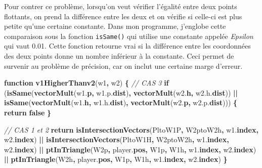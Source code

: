 \documentclass[11pt,french,a4paper,]{article}
\newenvironment{Shaded}{\begin{snugshade}}{\end{snugshade}}
\newcommand{\AttributeTok}[1]{\textcolor[rgb]{0.00,0.36,0.77}{\textbf{#1}}}
\newcommand{\CommentTok}[1]{\textcolor[rgb]{0.35,0.35,0.35}{\textit{#1}}}
\newcommand{\ControlFlowTok}[1]{\textcolor[rgb]{0.68,0.35,0.62}{\textbf{#1}}}
\newcommand{\KeywordTok}[1]{\textcolor[rgb]{0.68,0.35,0.62}{\textbf{#1}}}
\newcommand{\NormalTok}[1]{#1}
\newcommand{\OperatorTok}[1]{\textcolor[rgb]{0.81,0.36,0.00}{\textbf{#1}}}
\newcommand{\VariableTok}[1]{\textcolor[rgb]{0.90,0.33,0.00}{#1}}
\begin{document}
Pour contrer ce problème, lorsqu'on veut vérifier l'égalité entre deux
points flottants, on prend la différence entre les deux et on vérifie si
celle-ci est plus petite qu'une certaine constante. Dans mon programme,
j'englobe cette comparaison sous la fonction \texttt{isSame()} qui
utilise une constante appelée \emph{Epsilon} qui vaut 0.01. Cette
fonction retourne vrai si la différence entre les coordonnées des deux
points donne un nombre inférieur à la constante. Ceci permet de survenir
au problème de précision, car on inclut une certaine marge d'erreur.

\begin{Shaded}
\begin{Highlighting}[]
\KeywordTok{function} \AttributeTok{v1HigherThanv2}\NormalTok{(w1}\OperatorTok{,}\NormalTok{ w2) }\OperatorTok{\{}
    \CommentTok{// CAS 3}
    \ControlFlowTok{if}\NormalTok{ (}\AttributeTok{isSame}\NormalTok{(}\AttributeTok{vectorMult}\NormalTok{(}\VariableTok{w1}\NormalTok{.}\AttributeTok{p}\OperatorTok{,} \VariableTok{w1}\NormalTok{.}\VariableTok{p}\NormalTok{.}\AttributeTok{dist}\NormalTok{)}\OperatorTok{,} \AttributeTok{vectorMult}\NormalTok{(}\VariableTok{w2}\NormalTok{.}\AttributeTok{h}\OperatorTok{,} \VariableTok{w2}\NormalTok{.}\VariableTok{h}\NormalTok{.}\AttributeTok{dist}\NormalTok{)) }\OperatorTok{||}
        \AttributeTok{isSame}\NormalTok{(}\AttributeTok{vectorMult}\NormalTok{(}\VariableTok{w1}\NormalTok{.}\AttributeTok{h}\OperatorTok{,} \VariableTok{w1}\NormalTok{.}\VariableTok{h}\NormalTok{.}\AttributeTok{dist}\NormalTok{)}\OperatorTok{,} \AttributeTok{vectorMult}\NormalTok{(}\VariableTok{w2}\NormalTok{.}\AttributeTok{p}\OperatorTok{,} \VariableTok{w2}\NormalTok{.}\VariableTok{p}\NormalTok{.}\AttributeTok{dist}\NormalTok{))) }\OperatorTok{\{}
        \ControlFlowTok{return} \KeywordTok{false}
    \OperatorTok{\}}

    \CommentTok{// CAS 1 et 2}
    \ControlFlowTok{return}  \AttributeTok{isIntersectionVectors}\NormalTok{(PltoW1P}\OperatorTok{,}\NormalTok{ W2ptoW2h}\OperatorTok{,} \VariableTok{w1}\NormalTok{.}\AttributeTok{index}\OperatorTok{,} \VariableTok{w2}\NormalTok{.}\AttributeTok{index}\NormalTok{) }\OperatorTok{||}
            \AttributeTok{isIntersectionVectors}\NormalTok{(PltoW1H}\OperatorTok{,}\NormalTok{ W2ptoW2h}\OperatorTok{,} \VariableTok{w1}\NormalTok{.}\AttributeTok{index}\OperatorTok{,} \VariableTok{w2}\NormalTok{.}\AttributeTok{index}\NormalTok{) }\OperatorTok{||}
            \AttributeTok{ptInTriangle}\NormalTok{(W2p}\OperatorTok{,} \VariableTok{player}\NormalTok{.}\AttributeTok{pos}\OperatorTok{,}\NormalTok{ W1p}\OperatorTok{,}\NormalTok{ W1h}\OperatorTok{,} \VariableTok{w1}\NormalTok{.}\AttributeTok{index}\OperatorTok{,} \VariableTok{w2}\NormalTok{.}\AttributeTok{index}\NormalTok{) }\OperatorTok{||}
            \AttributeTok{ptInTriangle}\NormalTok{(W2h}\OperatorTok{,} \VariableTok{player}\NormalTok{.}\AttributeTok{pos}\OperatorTok{,}\NormalTok{ W1p}\OperatorTok{,}\NormalTok{ W1h}\OperatorTok{,} \VariableTok{w1}\NormalTok{.}\AttributeTok{index}\OperatorTok{,} \VariableTok{w2}\NormalTok{.}\AttributeTok{index}\NormalTok{)}
\OperatorTok{\}}
\end{Highlighting}
\end{Shaded}
\end{document}
